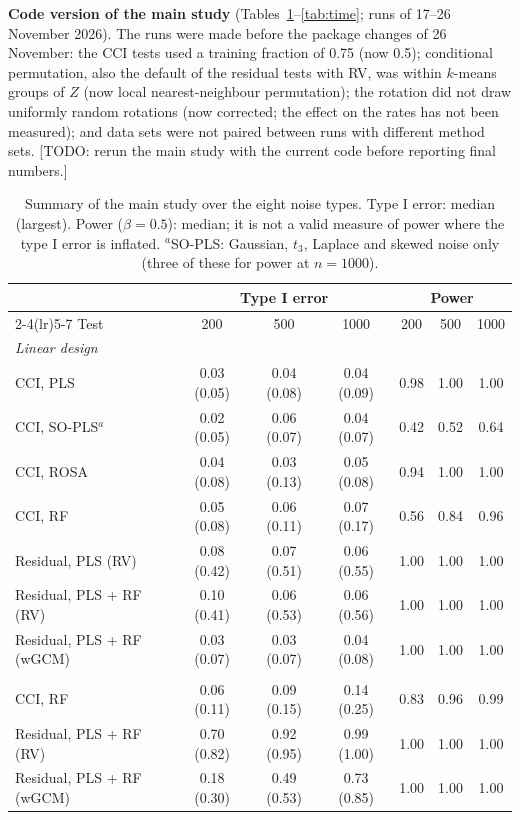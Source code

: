 \documentclass[10pt,leqno]{amsart}
\newcommand{\todo}[1]{{\color{red}[TODO: #1]}}
\begin{document}
\textbf{Code version of the main study} (Tables~\ref{tab:overview}--\ref{tab:time};
runs of 17--26 November 2026). The runs were made before the package changes of
26 November: the CCI tests used a training fraction of 0.75 (now 0.5); conditional
permutation, also the default of the residual tests with RV, was within $k$-means
groups of $Z$ (now local nearest-neighbour permutation); the rotation did not draw
uniformly random rotations (now corrected; the effect on the rates has not been
measured); and data sets were not paired between runs with different method sets.
\todo{rerun the main study with the current code before reporting final numbers.}

\begin{table}[H]
\caption{Summary of the main study over the eight noise types. Type I error: median (largest). Power ($\beta=0.5$): median; it is not a valid measure of power where the type I error is inflated. $^{a}$SO-PLS: Gaussian, $t_3$, Laplace and skewed noise only (three of these for power at $n=1000$).}
\label{tab:overview}
\footnotesize
\setlength{\tabcolsep}{3.5pt}
\begin{tabular}{lcccccc}
\toprule
 & \multicolumn{3}{c}{Type I error} & \multicolumn{3}{c}{Power} \\
\cmidrule(lr){2-4}\cmidrule(lr){5-7}
Test & 200 & 500 & 1000 & 200 & 500 & 1000 \\
\midrule
\multicolumn{7}{l}{\emph{Linear design}} \\
CCI, PLS & 0.03 (0.05) & 0.04 (0.08) & 0.04 (0.09) & 0.98 & 1.00 & 1.00 \\
CCI, SO-PLS$^{a}$ & 0.02 (0.05) & 0.06 (0.07) & 0.04 (0.07) & 0.42 & 0.52 & 0.64 \\
CCI, ROSA & 0.04 (0.08) & 0.03 (0.13) & 0.05 (0.08) & 0.94 & 1.00 & 1.00 \\
CCI, RF & 0.05 (0.08) & 0.06 (0.11) & 0.07 (0.17) & 0.56 & 0.84 & 0.96 \\
Residual, PLS (RV) & 0.08 (0.42) & 0.07 (0.51) & 0.06 (0.55) & 1.00 & 1.00 & 1.00 \\
Residual, PLS + RF (RV) & 0.10 (0.41) & 0.06 (0.53) & 0.06 (0.56) & 1.00 & 1.00 & 1.00 \\
Residual, PLS + RF (wGCM) & 0.03 (0.07) & 0.03 (0.07) & 0.04 (0.08) & 1.00 & 1.00 & 1.00 \\
\addlinespace
\multicolumn{7}{l}{\emph{Nonlinear design}} \\
CCI, RF & 0.06 (0.11) & 0.09 (0.15) & 0.14 (0.25) & 0.83 & 0.96 & 0.99 \\
Residual, PLS + RF (RV) & 0.70 (0.82) & 0.92 (0.95) & 0.99 (1.00) & 1.00 & 1.00 & 1.00 \\
Residual, PLS + RF (wGCM) & 0.18 (0.30) & 0.49 (0.53) & 0.73 (0.85) & 1.00 & 1.00 & 1.00 \\
\bottomrule
\end{tabular}
\end{table}
\end{document}
